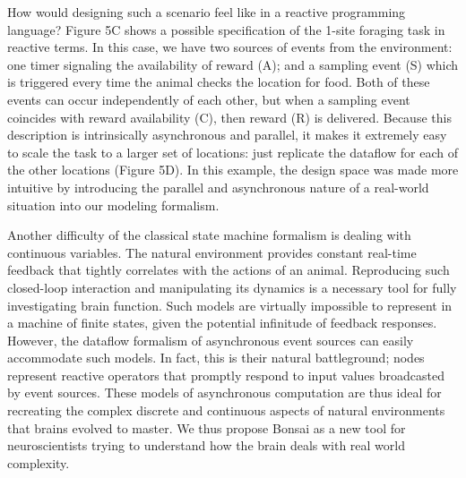 How would designing such a scenario feel like in a reactive programming language? Figure 5C shows a possible specification of the 1-site foraging task in reactive terms. In this case, we have two sources of events from the environment: one timer signaling the availability of reward (A); and a sampling event (S) which is triggered every time the animal checks the location for food. Both of these events can occur independently of each other, but when a sampling event coincides with reward availability (C), then reward (R) is delivered. Because this description is intrinsically asynchronous and parallel, it makes it extremely easy to scale the task to a larger set of locations: just replicate the dataflow for each of the other locations (Figure 5D). In this example, the design space was made more intuitive by introducing the parallel and asynchronous nature of a real-world situation into our modeling formalism.

Another difficulty of the classical state machine formalism is dealing with continuous variables. The natural environment provides constant real-time feedback that tightly correlates with the actions of an animal. Reproducing such closed-loop interaction and manipulating its dynamics is a necessary tool for fully investigating brain function. Such models are virtually impossible to represent in a machine of finite states, given the potential infinitude of feedback responses. However, the dataflow formalism of asynchronous event sources can easily accommodate such models. In fact, this is their natural battleground; nodes represent reactive operators that promptly respond to input values broadcasted by event sources. These models of asynchronous computation are thus ideal for recreating the complex discrete and continuous aspects of natural environments that brains evolved to master. We thus propose Bonsai as a new tool for neuroscientists trying to understand how the brain deals with real world complexity.

\pagebreak



